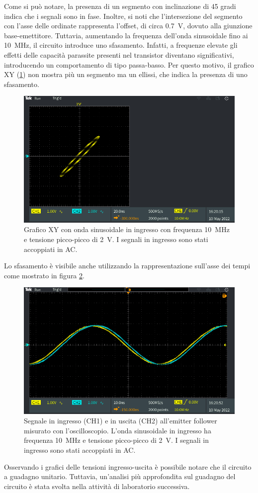 Come si può notare, la presenza di un segmento con inclinazione di 45 gradi indica che i segnali sono in fase. Inoltre, si noti che l'intersezione del segmento con l'asse delle ordinate rappresenta l'offset, di circa \SI{0.7}{\volt}, dovuto alla giunzione base-emettitore. 
Tuttavia, aumentando la frequenza dell'onda sinusoidale fino ai \SI{10}{\mega\hertz}, il circuito introduce uno sfasamento. Infatti, a frequenze elevate gli effetti delle capacità parassite presenti nel transistor diventano significativi, introducendo un comportamento di tipo passa-basso. Per questo motivo, il grafico XY (\Fig\ref{fig:emitterfollwer_XY_2}) non mostra più un segmento ma un ellissi, che indica la presenza di uno sfasamento. 
\begin{figure}[h!]
	\centering
	\includegraphics[width=0.7\linewidth]{./ImageFiles/Laboratorio 1/TEK00006}
	\caption{Grafico XY con onda sinusoidale in ingresso con frequenza \SI{10}{\mega\hertz} e tensione picco-picco di \SI{2}{\volt}. I segnali in ingresso sono stati accoppiati in AC.}
	\label{fig:emitterfollwer_XY_2}
\end{figure}
Lo sfasamento è visibile anche utilizzando la rappresentazione sull'asse dei tempi come mostrato in figura \ref{fig:emitterfollwer_oscilloscopio_2}.
\begin{figure}[h!]
	\centering
	\includegraphics[width=0.7\linewidth]{./ImageFiles/Laboratorio 1/TEK00007}
	\caption{Segnale in ingresso (CH1) e in uscita (CH2) all'emitter follower misurato con l'oscilloscopio. L'onda sinusoidale in ingresso ha frequenza \SI{10}{\mega\hertz} e tensione picco-picco di \SI{2}{\volt}. I segnali in ingresso sono stati accoppiati in AC.}
	\label{fig:emitterfollwer_oscilloscopio_2}
\end{figure}

\noindent
Osservando i grafici delle tensioni ingresso-uscita è possibile notare che il circuito a guadagno unitario. Tuttavia, un'analisi più approfondita sul guadagno del circuito è stata svolta nella attività di laboratorio successiva.